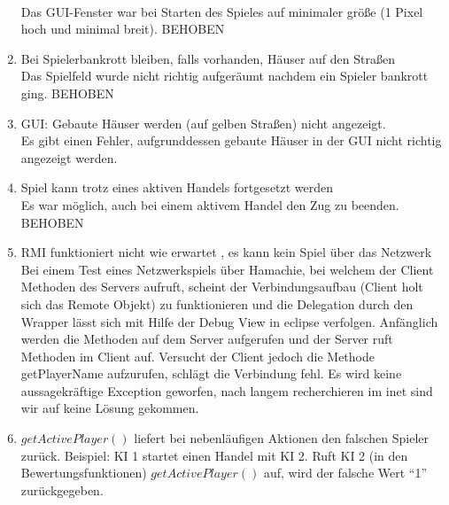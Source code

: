 \documentclass[a4paper,10pt]{article}
\begin{document}
\begin{enumerate}
\\Das GUI-Fenster war bei Starten des Spieles auf minimaler größe (1 Pixel hoch und minimal breit). BEHOBEN
\item Bei Spielerbankrott bleiben, falls vorhanden, Häuser auf den Straßen
\\Das Spielfeld wurde nicht richtig aufgeräumt nachdem ein Spieler bankrott ging. BEHOBEN
\item GUI: Gebaute Häuser werden (auf gelben Straßen) nicht angezeigt.
\\Es gibt einen Fehler, aufgrunddessen gebaute Häuser in der GUI nicht richtig angezeigt werden.
\item Spiel kann trotz eines aktiven Handels fortgesetzt werden
\\Es war möglich, auch bei einem aktivem Handel den Zug zu beenden. BEHOBEN
\item RMI funktioniert nicht wie erwartet , es kann kein Spiel über das Netzwerk 
\\Bei einem Test eines Netzwerkspiels über Hamachie, bei welchem der Client Methoden des Servers aufruft,
 scheint der Verbindungsaufbau (Client holt sich das Remote Objekt) zu funktionieren und die Delegation durch den Wrapper lässt 
 sich mit Hilfe der Debug View in eclipse verfolgen. Anfänglich werden die Methoden auf dem Server aufgerufen und der Server ruft Methoden im Client auf.
 Versucht der Client jedoch die Methode getPlayerName aufzurufen, schlägt die Verbindung fehl. Es wird keine aussagekräftige Exception geworfen, nach langem recherchieren im inet sind wir auf keine Lösung gekommen.
\item $getActivePlayer()$ liefert bei nebenläufigen Aktionen den falschen Spieler zurück.
Beispiel: KI 1 startet einen Handel mit KI 2. Ruft KI 2 (in den Bewertungsfunktionen) $getActivePlayer()$ auf, wird der falsche Wert ``1'' zurückgegeben.
\end{enumerate}
\end{document}
